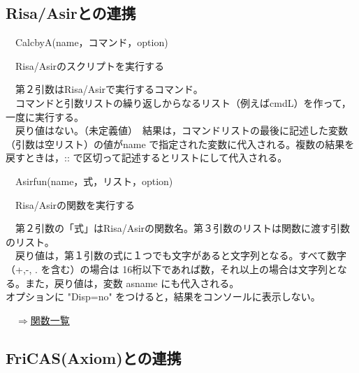 \documentclass[papersize,a4paper,12pt,uplatex]{jsarticle}
\begin{document}
\subsection{Risa/Asirとの連携}

\begin{description}

\hypertarget{calcbyA}{}
\item[関数]　CalcbyA(name，コマンド，option)
\item[機能]　Risa/Asirのスクリプトを実行する
\item[説明]　第２引数はRisa/Asirで実行するコマンド。\\
　コマンドと引数リストの繰り返しからなるリスト（例えばcmdL）を作って，一度に実行する。\\
　戻り値はない。（未定義値）　結果は，コマンドリストの最後に記述した変数（引数は空リスト）の値がname で指定された変数に代入される。複数の結果を戻すときは，:: で区切って記述するとリストにして代入される。\\

\hypertarget{asirfun}{}
\item[関数]　Asirfun(name，式，リスト，option)
\item[機能]　Risa/Asirの関数を実行する
\item[説明]　第２引数の「式」はRisa/Asirの関数名。第３引数のリストは関数に渡す引数のリスト。\\
　戻り値は，第１引数の式に１つでも文字があると文字列となる。すべて数字（+,-, . を含む）の場合は
16桁以下であれば数，それ以上の場合は文字列となる。また，戻り値は，変数 asname にも代入される。\\
オプションに "Disp=no" をつけると，結果をコンソールに表示しない。\\

\end{description}
\begin{flushright}　\hyperlink{functionlist}{$\Rightarrow$関数一覧}\end{flushright}

\newpage
\subsection{FriCAS(Axiom)との連携}
\end{document}
